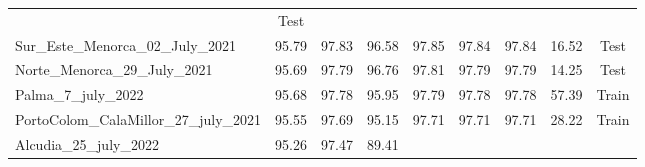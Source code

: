 \begin{table}[H]
{\begin{tabular}{lcccccccc}
                                                   & {\color[HTML]{fc8d62}
                    Test}
            \\
            Sur\_Este\_Menorca\_02\_July\_2021     & 95.79
                                                   & 97.83
                                                   & 96.58
                                                   & 97.85
                                                   & 97.84
                                                   & 97.84
                                                   & 16.52
                                                   & {\color[HTML]{fc8d62}
                    Test}
            \\
            Norte\_Menorca\_29\_July\_2021         & 95.69
                                                   & 97.79
                                                   & 96.76
                                                   & 97.81
                                                   & 97.79
                                                   & 97.79
                                                   & 14.25
                                                   & {\color[HTML]{fc8d62}
                    Test}
            \\
            Palma\_7\_july\_2022                   & 95.68
                                                   & 97.78
                                                   & 95.95
                                                   & 97.79
                                                   & 97.78
                                                   & 97.78
                                                   & 57.39
                                                   & {\color[HTML]{66c2a5}
                    Train}
            \\
            PortoColom\_CalaMillor\_27\_july\_2021 & 95.55
                                                   & 97.69
                                                   & 95.15
                                                   & 97.71
                                                   & 97.71
                                                   & 97.71
                                                   & 28.22
                                                   & {\color[HTML]{66c2a5}
                    Train}
            \\
            Alcudia\_25\_july\_2022                & 95.26
                                                   & 97.47
                                                   & 89.41

\end{tabular}}
\end{table}
